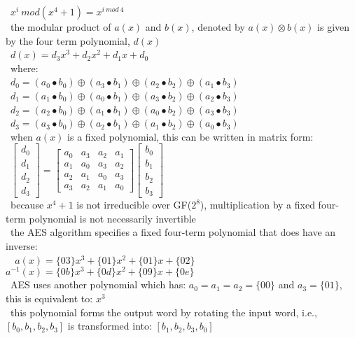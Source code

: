 \documentclass[10pt,letterpaper]{scrartcl}
\newcommand{\tend}{\>\textendash}
\begin{document}
\begin{tabbing}
\>\>\>\>\ $x^i\ mod(x^4+1)=x^{i\ mod\ 4}$\\
    \tend\ the modular product of $a(x)$ and $b(x)$, denoted by $a(x)\otimes b(x)$ is given by the four term polynomial, $d(x)$\\
\>\>\>\>\ $d(x)=d_3x^3+d_2x^2+d_1x+d_0$\\
    \tend\ where: \\
\>\>\>\>\ $d_0 = (a_0\bullet b_0)\oplus (a_3\bullet b_1)\oplus (a_2\bullet b_2)\oplus (a_1\bullet b_3)$ \\
\>\>\>\>\ $d_1 = (a_1\bullet b_0)\oplus (a_0\bullet b_1)\oplus (a_3\bullet b_2)\oplus (a_2\bullet b_3)$ \\
\>\>\>\>\ $d_2 = (a_2\bullet b_0)\oplus (a_1\bullet b_1)\oplus (a_0\bullet b_2)\oplus (a_3\bullet b_3)$ \\
\>\>\>\>\ $d_3 = (a_3\bullet b_0)\oplus (a_2\bullet b_1)\oplus (a_1\bullet b_2)\oplus (a_0\bullet b_3)$ \\
    \tend\ when $a(x)$ is a fixed polynomial, this can be written in matrix form: \\
\>\>\>\>\ $\begin{bmatrix} d_0 \\ d_1 \\ d_2 \\ d_3 \end{bmatrix}  = \begin{bmatrix} a_0 & a_3 & a_2 & a_1 \\ a_1 & a_0 & a_3 & a_2 \\ a_2 & a_1 & a_0 & a_3 \\ a_3 & a_2 & a_1 & a_0\end{bmatrix}\begin{bmatrix} b_0 \\ b_1 \\ b_2 \\ b_3 \end{bmatrix}$\\
    \tend\ because $x^4 + 1$ is not irreducible over GF($2^8$), multiplication by a fixed four-term polynomial is not necessarily invertible \\
    \tend\ the AES algorithm specifies a fixed four-term polynomial that does have an inverse: \\
\>\>\>\>\ $\ \ a(x)=\{03\}x^3+\{01\}x^2+\{01\}x+\{02\}$ \\
\>\>\>\> $a^{-1}(x)=\{0b\}x^3+\{0d\}x^2+\{09\}x+\{0e\}$ \\
    \tend\ AES uses another polynomial which has: $a_0 = a_1 = a_2 = \{00\}$ and $a_3 = \{01\}$, this is equivalent to: $x^3$ \\ 
    \tend\ this polynomial forms the output word by rotating the input word, i.e., $[b_0, b_1, b_2, b_3]$ is transformed into: $[b_1, b_2, b_3, b_0]$ \\
\end{tabbing}
\end{document}
